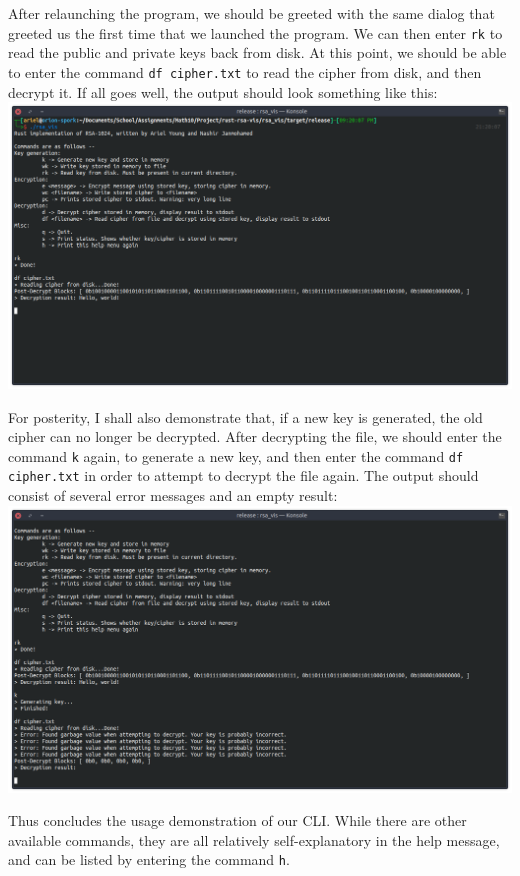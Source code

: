 \documentclass{article}
\newcommand{\code}[1]{\colorbox{light-gray}{\texttt{#1}}}
\begin{document}
After relaunching the program, we should be greeted with the same dialog that greeted us the first time that we launched the program. We can then enter \code{rk} to read the public and private keys back from disk. At this point, we should be able to enter the command \code{df cipher.txt} to read the cipher from disk, and then decrypt it. If all goes well, the output should look something like this:
\includegraphics[width=\textwidth]{three}

For posterity, I shall also demonstrate that, if a new key is generated, the old cipher can no longer be decrypted. After decrypting the file, we should enter the command \code{k} again, to generate a new key, and then enter the command \code{df cipher.txt} in order to attempt to decrypt the file again. The output should consist of several error messages and an empty result: \\
\includegraphics[width=\textwidth]{four}

Thus concludes the usage demonstration of our CLI. While there are other available commands, they are all relatively self-explanatory in the help message, and can be listed by entering the command \code{h}.
\end{document}
